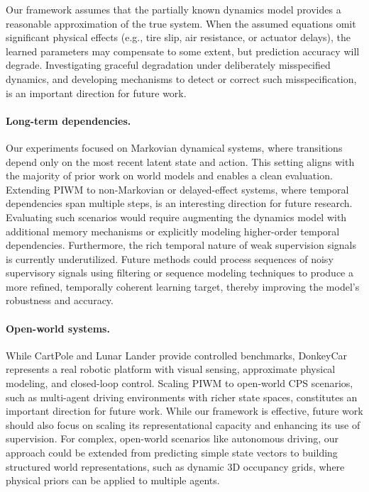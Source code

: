 \documentclass[nonacm,sigconf]{acmart}
\begin{document}
Our framework assumes that the partially known dynamics model provides a reasonable approximation of the true system. When the assumed equations omit significant physical effects (e.g., tire slip, air resistance, or actuator delays), the learned parameters may compensate to some extent, but prediction accuracy will degrade. Investigating graceful degradation under deliberately misspecified dynamics, and developing mechanisms to detect or correct such misspecification, is an important direction for future work.

\paragraph{Long-term dependencies.} 
Our experiments focused on Markovian dynamical systems, where transitions depend only on the most recent latent state and action. This setting aligns with the majority of prior work on world models and enables a clean evaluation. Extending PIWM to non-Markovian or delayed-effect systems, where temporal dependencies span multiple steps, is an interesting direction for future research. Evaluating such scenarios would require augmenting the dynamics model with additional memory mechanisms or explicitly modeling higher-order temporal dependencies. Furthermore, the rich temporal nature of weak supervision signals is currently underutilized. Future methods could process sequences of noisy supervisory signals using filtering or sequence modeling techniques to produce a more refined, temporally coherent learning target, thereby improving the model's robustness and accuracy. 

\paragraph{Open-world systems.}
While CartPole and Lunar Lander provide controlled benchmarks, DonkeyCar represents a real robotic platform with visual sensing, approximate physical modeling, and closed-loop control. Scaling PIWM to open-world CPS scenarios, such as multi-agent driving environments with richer state spaces, constitutes an important direction for future work. While our framework is effective, future work should also focus on scaling its representational capacity and enhancing its use of supervision. For complex, open-world scenarios like autonomous driving, our approach could be extended from predicting simple state vectors to building structured world representations, such as dynamic 3D occupancy grids, where physical priors can be applied to multiple agents. 
\end{document}
